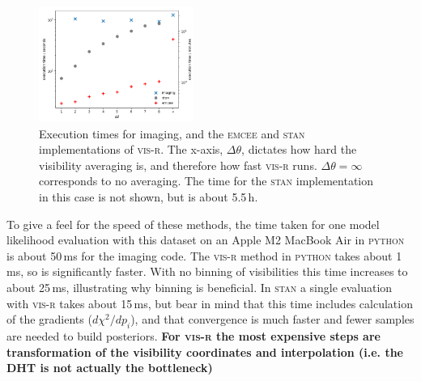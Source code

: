 \documentclass[fleqn,usenatbib]{mnras}
\begin{document}
\begin{figure}
    \centering
    \includegraphics[width=0.45\textwidth]{doc/timing.png}
    \caption{Execution times for imaging, and the \textsc{emcee} and \textsc{stan} implementations of \textsc{vis-r}. The x-axis, $\Delta \theta$, dictates how hard the visibility averaging is, and therefore how fast \textsc{vis-r} runs. $\Delta \theta = \infty$ corresponds to no averaging. The time for the \textsc{stan} implementation in this case is not shown, but is about 5.5\,h.}
    \label{fig:timing}
\end{figure}

To give a feel for the speed of these methods, the time taken for one model likelihood evaluation with this dataset on an Apple M2 MacBook Air in \textsc{python} is about 50\,ms for the imaging code. The \textsc{vis-r} method in \textsc{python} takes about 1\,ms, so is significantly faster. With no binning of visibilities this time increases to about 25\,ms, illustrating why binning is beneficial. In \textsc{stan} a single evaluation with \textsc{vis-r} takes about 15\,ms, but bear in mind that this time includes calculation of the gradients ($d \chi^2 / dp_i$), and that convergence is much faster and fewer samples are needed to build posteriors. \textbf{For \textsc{vis-r} the most expensive steps are transformation of the visibility coordinates and interpolation (i.e. the DHT is not actually the bottleneck)}
\end{document}
